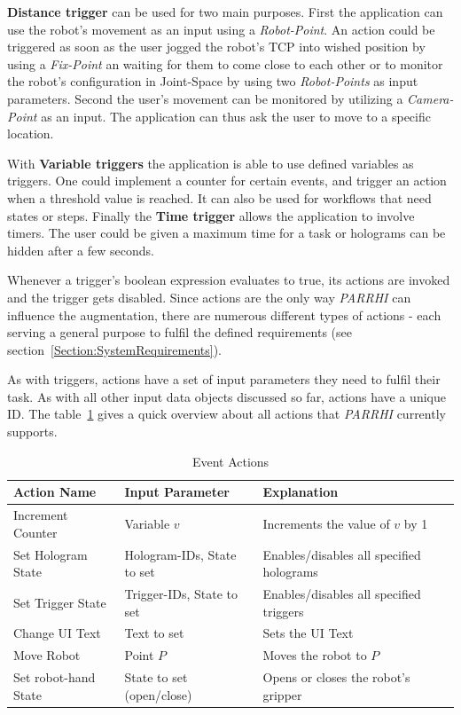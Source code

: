 \textbf{Distance trigger} can be used for two main purposes. First the application can use the robot's movement as an input using a \textit{Robot-Point}. An action could be triggered as soon as the user jogged the robot's TCP into wished position by using a \textit{Fix-Point} an waiting for them to come close to each other or to monitor the robot's configuration in Joint-Space by using two \textit{Robot-Points} as input parameters. Second the user's movement can be monitored by utilizing a \textit{Camera-Point} as an input. The application can thus ask the user to move to a specific location.

With \textbf{Variable triggers} the application is able to use defined variables as triggers. One could implement a counter for certain events, and trigger an action when a threshold value is reached. It can also be used for workflows that need states or steps. Finally the \textbf{Time trigger} allows the application to involve timers. The user could be given a maximum time for a task or holograms can be hidden after a few seconds.

Whenever a trigger's boolean expression evaluates to true, its actions are invoked and the trigger gets disabled. Since actions are the only way \textit{PARRHI} can influence the augmentation, there are numerous different types of actions - each serving a general purpose to fulfil the defined requirements (see section~\ref{Section:SystemRequirements}).

As with triggers, actions have a set of input parameters they need to fulfil their task. As with all other input data objects discussed so far, actions have a unique ID. The table~\ref{Table:Actions} gives a quick overview about all actions that \textit{PARRHI} currently supports.

\begin{table}
	\caption{Event Actions}
	\label{Table:Actions}
	\centering
	\begin{tabular}{lll}
		\toprule
		Action Name & Input Parameter		& Explanation	\\		
		\midrule
		Increment Counter  	& Variable $v$					& Increments the value of $v$ by 1 \\
		Set Hologram State 	& Hologram-IDs, State to set	& Enables/disables all specified holograms \\
		Set Trigger State  	& Trigger-IDs, State to set    	& Enables/disables all specified triggers \\
		Change UI Text	  	& Text to set					& Sets the UI Text\\
		Move Robot			& Point $P$						& Moves the robot to $P$ \\
		Set robot-hand State & State to set (open/close)		& Opens or closes the robot's gripper \\
		\bottomrule
	\end{tabular}
\end{table}

